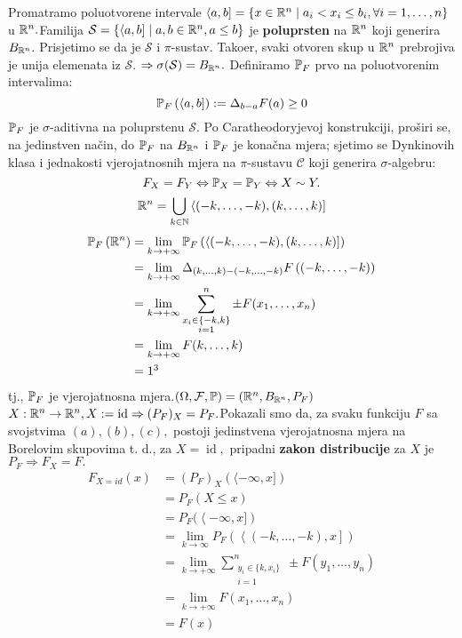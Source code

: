 \documentclass{article}
\newcommand{\id}{\operatorname{id}}
\begin{document}
Promatramo poluotvorene intervale \(\langle a,b]=\left\{x\in\Bbb R^n\mid a_i<x_i\le b_i,\forall i=1,\ldots,n\right\}\) u \(\Bbb R^n.\)\newline Familija \(\mathcal S=\left\{\langle a,b]\mid a,b\in\Bbb R^n,a\le b\right\}\) je \textbf{poluprsten} na \(\Bbb R^n\) koji generira \(B_{\Bbb R^n}.\) Prisjetimo se da je \(\mathcal S\) i \(\pi\)-sustav. Tako\dj{}er, svaki otvoren skup u \(\Bbb R^n\) prebrojiva je unija elemenata iz \(\mathcal S.\) \(\Rightarrow\sigma(\mathcal S)= B_{\Bbb R^n}.\) \newline Definiramo \(\Bbb P_F\) prvo na poluotvorenim intervalima: \[\Bbb P_F\left(\langle a,b]\right):=\Delta_{b-a}F(a)\ge 0\] \(\Bbb P_F\) je \(\sigma\)-aditivna na poluprstenu \(\mathcal S.\) Po Caratheodoryjevoj konstrukciji, proširi se, na jedinstven način, do \(\Bbb P_F\) na \(B_{\Bbb R^n}\) i \(\Bbb P_F\) je konačna mjera; sjetimo se Dynkinovih klasa i jednakosti vjerojatnosnih mjera na \(\pi\)-sustavu \(\mathcal C\) koji generira \(\sigma\)-algebru: \[F_X=F_Y\Leftrightarrow\Bbb P_X=\Bbb P_Y\Leftrightarrow X\sim Y.\] \[\Bbb R^n=\bigcup_{k\in\Bbb N}\left\langle(-k,\ldots,-k),(k,\ldots,k)\right]\]
\[\begin{aligned}\Bbb P_F\left(\Bbb R^n\right)&=\lim_{k\to+\infty}\Bbb P_F\left(\left\langle(-k,\ldots,-k),(k,\ldots,k)\right]\right)\\&=\lim_{k\to+\infty}\Delta_{(k,\ldots,k)-(-k,\ldots,-k)}F\left((-k,\ldots,-k)\right)\\&=\lim_{k\to+\infty}\sum_{\substack{x_i\in\{-k,k\}\\i=1}}^n\pm F(x_1,\ldots,x_n)\\&=\lim_{k\to+\infty}F(k,\ldots,k)\\&=1\footnotemark[3]\end{aligned}\] tj., \(\Bbb P_F\) je vjerojatnosna mjera.\newline \((\Omega,\mathcal F,\Bbb P)=\left(\Bbb R^n, B_{\Bbb R^n},P_F\right)\)\newline \(X:\Bbb R^n\to\Bbb R^n, X:=\id\Rightarrow (P_F)_X=P_F.\)\newline Pokazali smo da, za svaku funkciju \(F\) sa svojstvima \((a),(b),(c),\) postoji jedinstvena vjerojatnosna mjera na Borelovim skupovima t. d., za \(X=\id,\) pripadni \textbf{zakon distribucije} za \(X\) je \(P_F\Rightarrow F_X=F.\)
\[\begin{aligned}F_{X=id}(x)&=(P_F)_X\left(\langle-\infty,x]\right)\\&=P_F(X\le x)\\&=P_F(\left\langle-\infty,x]\right)\\&=\lim_{k\to\infty}P_F\left(\left\langle(-k,\ldots,-k),x\right]\right)\\&=\lim_{k\to+\infty}\sum_{\substack{y_i\in\{k,x_i\}\\i=1}}^n\pm F(y_1,\ldots,y_n)\\&=\lim_{k\to+\infty}F(x_1,\ldots,x_n)\\&=F(x)\end{aligned}\]
\end{document}
